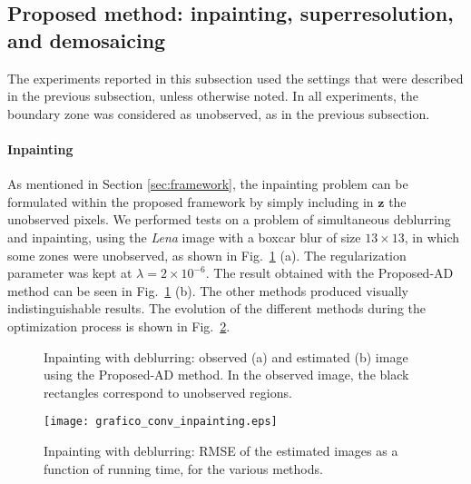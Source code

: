 \documentclass[10pt,twocolumn,twoside]{IEEEtran}
\newcommand{\z}{\mathbf{z}} %
\begin{document}
\subsection{Proposed method: inpainting, superresolution, and demosaicing} \label{sec:exp_app}

The experiments reported in this subsection used the settings that were described in the previous subsection, unless otherwise noted. In all experiments, the boundary zone was considered as unobserved, as in the previous subsection.

\paragraph{Inpainting}

As mentioned in Section \ref{sec:framework}, the inpainting problem can be formulated within the proposed framework by simply including in $\z$ the unobserved pixels. We performed tests on a problem of simultaneous deblurring and inpainting, using the \emph{Lena} image with a boxcar blur of size $13 \times 13$, in which some zones were unobserved, as shown in Fig.~\ref{fig:lena_inpainting} (a). The regularization parameter was kept at $\lambda = 2 \times 10^{-6}$. The result obtained with the Proposed-AD method can be seen in Fig.~\ref{fig:lena_inpainting} (b). The other methods produced visually indistinguishable results. The evolution of the different methods during the optimization process is shown in Fig.~\ref{fig:grafico_conv_inpainting}.

\begin{figure}[!t]
	\centering
	\hfil
	\caption{Inpainting with deblurring: observed (a) and estimated (b) image using the Proposed-AD method. In the observed image, the black rectangles correspond to unobserved regions.}
	\label{fig:lena_inpainting}
\end{figure}

\begin{figure}[!t]
	\centering
	\texttt{[image: grafico\_conv\_inpainting.eps]}%
	\caption{Inpainting with deblurring: RMSE of the estimated images as a function of running time, for the various methods.}
	\label{fig:grafico_conv_inpainting}
\end{figure}
\end{document}
